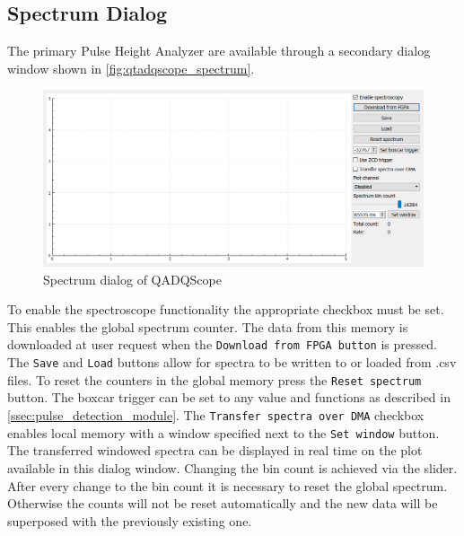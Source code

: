 \documentclass[a4paper,12pt,table]{article}
\begin{document}
	\subsection{Spectrum Dialog}
		The primary Pulse Height Analyzer are available through a secondary dialog window 
		shown in \autoref{fig:qtadqscope_spectrum}.
		\begin{figure}[!ht]
			\centering
			\includegraphics[width=\textwidth]{img/qtadqscope_spectrum.png}
			\caption{Spectrum dialog of QADQScope}\label{fig:qtadqscope_spectrum}
		\end{figure}
		To enable the spectroscope functionality the appropriate checkbox must be set.
		This enables the global spectrum counter. 
		The data from this memory is downloaded at user request 
		when the \verb|Download from FPGA button| is pressed.
		The \verb|Save| and \verb|Load| buttons allow for spectra to be written to or loaded from .csv files.
		To reset the counters in the global memory press the \verb|Reset spectrum| button.
		The boxcar trigger can be set to any value and functions as described in \autoref{ssec:pulse_detection_module}.
		The \verb|Transfer spectra over DMA| checkbox enables local memory
		with a window specified next to the \verb|Set window| button.
		The transferred windowed spectra can be displayed in real time on the plot available in this dialog window.
		Changing the bin count is achieved via the slider. 
		After every change to the bin count it is necessary to reset the global spectrum.
		Otherwise the counts will not be reset automatically
		and the new data will be superposed with the previously existing one.
\newpage
\end{document}
